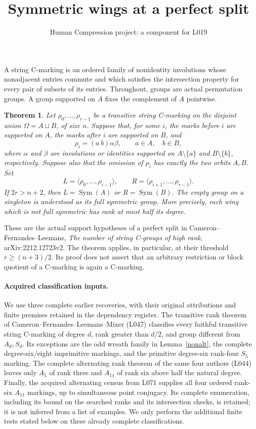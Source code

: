 \documentclass[11pt,a4paper]{article}
\title{Symmetric wings at a perfect split}
\author{Human Compression project: a component for L019}
\date{}
\newtheorem{theorem}{Theorem}
\newcommand{\gen}[1]{\langle#1\rangle}
\newcommand{\Sym}{\operatorname{Sym}}
\begin{document}
\maketitle
A string C-marking is an ordered family of nonidentity involutions
whose nonadjacent entries commute and which satisfies the intersection
property for every pair of subsets of its entries. Throughout, groups
are actual permutation groups. A group supported on $A$ fixes the
complement of $A$ pointwise.

\begin{theorem}\label{wing}
Let $\rho_0,\ldots,\rho_{r-1}$ be a transitive string C-marking on
the disjoint union $\Omega=A\sqcup B$, of size $n$. Suppose that,
for some $i$, the marks before $i$ are supported on $A$, the marks
after $i$ are supported on $B$, and
\[
 \rho_i=(a\ b)\alpha\beta,\qquad a\in A,\quad b\in B,
\]
where $\alpha$ and $\beta$ are involutions or identities supported
on $A\setminus\{a\}$ and $B\setminus\{b\}$, respectively.
Suppose also that the omission of $\rho_i$ has exactly the two
orbits $A,B$. Set
\[
 L=\gen{\rho_0,\ldots,\rho_{i-1}},\qquad
 R=\gen{\rho_{i+1},\ldots,\rho_{r-1}}.
\]
If $2r>n+2$, then $L=\Sym(A)$ or $R=\Sym(B)$.
The empty group on a singleton is understood as its full symmetric
group. More precisely, each wing which is not full symmetric has
rank at most half its degree.
\end{theorem}

These are the actual support hypotheses of a perfect split in
Cameron--Fernandes--Leemans, \emph{The number of string C-groups of
high rank}, arXiv:2212.12723v2. The theorem applies, in particular,
at their threshold $r\ge(n+3)/2$. Its proof does not assert that an
arbitrary restriction or block quotient of a C-marking is again a
C-marking.

\paragraph{Acquired classification inputs.}
We use three complete earlier recoveries, with their original
attributions and finite premises retained in the dependency register.
The transitive rank theorem of Cameron--Fernandes--Leemans--Mixer
(L047) classifies every faithful transitive string C-marking of
degree $d$, rank greater than $d/2$, and group different from
$A_d,S_d$. Its exceptions are the odd wreath family in
Lemma~\ref{nonalt}, the complete degree-six/eight imprimitive
markings, and the primitive degree-six rank-four $S_5$ marking.
The complete alternating rank theorem of the same four authors
(L044) leaves only $A_5$ of rank three and $A_{11}$ of rank six
above half the natural degree. Finally, the acquired alternating
census from L071 supplies all four ordered rank-six $A_{11}$
markings, up to simultaneous point conjugacy. Its complete
enumeration, including its bound on the searched ranks and its
intersection checks, is retained; it is not inferred from a list
of examples. We only perform the additional finite tests stated
below on these already complete classifications.
\end{document}

